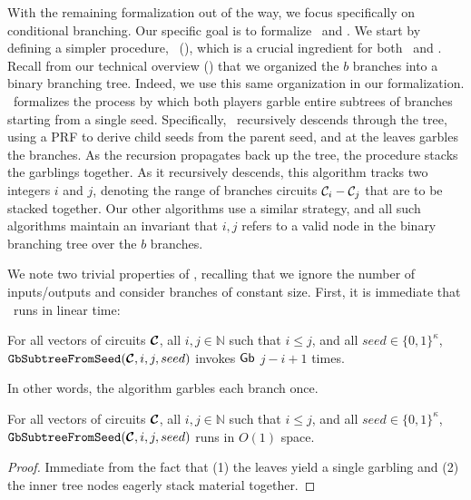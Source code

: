 With the remaining formalization out of the way, we focus specifically
on conditional branching. Our specific goal is to formalize \evcond\
and \gbcond.
We start by defining a simpler procedure, \gbtree~(),
which is a crucial ingredient for both \evcond\ and \gbcond.
Recall from our technical overview () that we
organized the $b$ branches into a binary branching tree.
%
Indeed, we use this same organization in our formalization.
\gbtree\ formalizes the process by which both players
garble entire subtrees of branches starting from a single seed.
Specifically, \gbtree\ recursively descends through the
tree, using a PRF to derive child seeds from the parent seed, and at the
leaves garbles the branches.
As the recursion propagates back up the tree, the procedure stacks the
garblings together.
%
As it recursively descends, this algorithm tracks two integers $i$ and
$j$, denoting the range of branches circuits $\mathcal C_i - \mathcal C_j$ that are to
be stacked together.
Our other algorithms use a similar strategy, and all such algorithms
maintain an invariant that $i,j$ refers to a valid node in the binary
branching tree over the $b$ branches.


We note two trivial properties of \gbtree, recalling that we ignore
the number of inputs/outputs and consider branches of constant size.
First, it is immediate that \gbtree\ runs in linear time:
\begin{lemma}\label{lemma:gbtreetime}
  For all vectors of circuits $\vec \cir$, all $i, j \in \mathbb{N}$
  such that $i \leq j$, and all $seed \in \{0, 1\}^\kappa$,
  $\gbtree(\vec \cir, i, j, seed)$ invokes $\textsf{Gb}$ $j - i + 1$ times.
\end{lemma}
In other words, the algorithm garbles each branch once.

\begin{lemma}\label{lemma:gbtreetime}
  For all vectors of circuits $\vec \cir$, all $i, j \in \mathbb{N}$
  such that $i \leq j$, and all $seed \in \{0, 1\}^\kappa$,
  $\gbtree(\vec \cir, i, j, seed)$ runs in $O(1)$ space.
\end{lemma}
\begin{proof}
Immediate from the fact that (1) the leaves yield a single garbling
and (2) the inner tree nodes eagerly stack material together.
\end{proof}

